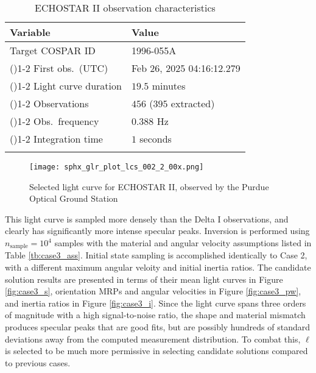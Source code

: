 \documentclass[a4paper,twocolumn]{spaceDebrisC} %
\newcommand{\grule}[0]{\arrayrulecolor{darkgray}\cmidrule(){1-2}}
\newcommand{\brule}[0]{\arrayrulecolor{black} \bottomrule}
\newcommand{\figbig}[0]{0.5\textwidth}
\begin{document}
\begin{table}[H]
  \centering
  \renewcommand{\arraystretch}{1.3} %
  \caption{ECHOSTAR II observation characteristics}
  \vspace*{6pt}
  \begin{tabular}{@{} l l @{}}
    \toprule
    Variable & Value \\ \midrule
    Target COSPAR ID & 1996-055A \\ \grule
    First obs.\ (UTC) & Feb 26, 2025 04:16:12.279 \\ \grule
    Light curve duration & $19.5$ minutes \\ \grule
    Observations & $456$ ($395$ extracted) \\ \grule
    Obs.\ frequency & $0.388$ Hz \\ \grule
    Integration time & $1$ seconds \\ \brule
  \end{tabular}
  \label{tb:case3_in}
\end{table}

\begin{figure}[H]
  \centering
  \texttt{[image: sphx\_glr\_plot\_lcs\_002\_2\_00x.png]}
  \caption{Selected light curve for ECHOSTAR II, observed by the Purdue Optical Ground Station}
  \label{fig:sat_lc_obs}
\end{figure}

This light curve is sampled more densely than the Delta I observations, and clearly has significantly more intense specular peaks. Inversion is performed using $n_\text{sample}=10^4$ samples with the material and angular velocity assumptions listed in Table \ref{tb:case3_ass}. Initial state sampling is accomplished identically to Case 2, with a different maximum angular veloity and initial inertia ratios. The candidate solution results are presented in terms of their mean light curves in Figure \ref{fig:case3_s}, orientation MRPs and angular velocities in Figure \ref{fig:case3_pw}, and inertia ratios in Figure \ref{fig:case3_i}. Since the light curve spans three orders of magnitude with a high signal-to-noise ratio, the shape and material mismatch produces specular peaks that are good fits, but are possibly hundreds of standard deviations away from the computed measurement distribution. To combat this, $\ell$ is selected to be much more permissive in selecting candidate solutions compared to previous cases.
\end{document}

